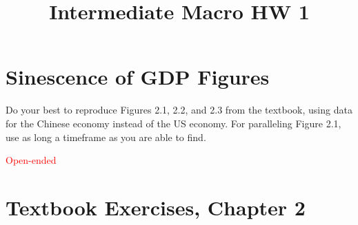 \documentclass{article}
\begin{document}
\title{Intermediate Macro HW 1}

\maketitle

\section{Sinescence of GDP Figures}

Do your best to reproduce Figures 2.1, 2.2, and 2.3 from the textbook, using data for the Chinese economy instead of the US economy. For paralleling Figure 2.1, use as long a timeframe as you are able to find.

\textcolor{red}{Open-ended}

\section{Textbook Exercises, Chapter 2}
\end{document}
